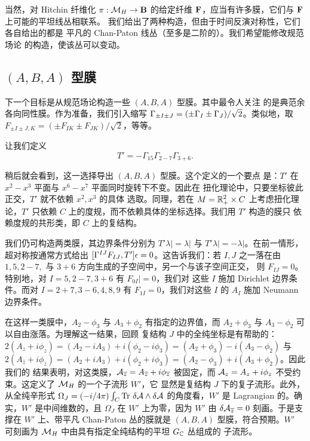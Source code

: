 当然，对 Hitchin 纤维化 $\pi:\MH\to{{\cmmib B}}$ 的给定纤维
${\CMF}$，应当有许多膜，它们与 ${\CMF}$ 上可能的平坦线丛相联系。
我们给出了两种构造，但由于时间反演对称性，它们各自给出的都是
平凡的 Chan-Paton 线丛（至多是二阶的）。我们希望能修改规范场论
的构造，使该丛可以变动。

\subsection{$(A,B,A)$ 型膜}\label{sec:xgoto}

下一个目标是从规范场论构造一些 $(A,B,A)$ 型膜。其中最令人关注
的是典范余各向同性膜。作为准备，我们引入缩写
$\Gamma_{\pm I\pm J}=(\pm \G_I\pm \G_J)/\sqrt 2$。类似地，取
$F_{\pm I\pm J,K}=(\pm F_{IK}\pm F_{JK})/\sqrt 2$，等等。

让我们定义 %
\setcounter{equation}{27}
\begin{equation}\label{eq:jokko}
T'=-\Gamma_{15}\Gamma_{2-7}\Gamma_{3+6}.
\end{equation}

稍后就会看到，这一选择导出 $(A,B,A)$ 型膜。这个定义的一个要点
是：$T'$ 在 $x^2-x^3$ 平面与 $x^6-x^7$ 平面同时旋转下不变。因此在
扭化理论中，只要坐标彼此正交，$T'$ 就不依赖 $x^2,x^3$ 的具体
选取。同理，若在 $M=\RR_+^2\times C$ 上考虑扭化理论，$T'$ 只依赖
$C$ 上的度规，而不依赖具体的坐标选择。我们用 $T'$ 构造的膜只
依赖度规的共形类，即 $C$ 上的复结构。

我们仍可构造两类膜，其边界条件分别为 $T'\lambda|=\lambda|$ 与
$T'\lambda|=-\lambda|$。在前一情形，超对称按通常方式给出
$[\G^{IJ}F_{IJ},T']\epsilon=0$。这告诉我们：若 $I,J$ 之一落在由
$1,5,2-7,$ 与 $3+6$ 方向生成的子空间中，另一个与该子空间正交，
则 $F_{IJ}=0$。特别地，对 $I=5,2-7,3+6$ 有 $F_{0I}|=0$，我们对
这些 $I$ 施加 Dirichlet 边界条件。而对 $I=2+7,3-6,4,8,9$ 有
$F_{1I}=0$，我们对这些 $I$ 的 $A_I$ 施加 Neumann 边界条件。

在这样一类膜中，$A_2-\phi_3$ 与 $A_3+\phi_2$ 有指定的边界值，而
$A_2+\phi_3$ 与 $A_3-\phi_2$ 可以自由涨落。为理解这一结果，回顾
复结构 $J$ 中的全纯坐标是有帮助的：
$2(A_z+i\phi_z)=(A_2-i A_3)+i(\phi_2-i\phi_3)=(A_2+\phi_3)-i(
A_3-\phi_2)$ 与
$2(A_{\bar z}+i\phi_{\bar z})=(A_2+i
A_3)+i(\phi_2+i\phi_3)=(A_2-\phi_3)+i( A_3+\phi_2)$。因此我们的
结果表明，对这类膜，${\cal A}_{\bar
z}=A_{\bar z}+i\phi_{\bar z}$ 被固定，而 ${\cal A}_{ z}=A_{
z}+i\phi_{ z}$ 不受约束。这定义了 $\MH$ 的一个子流形 $W'$，它
显然是复结构 $J$ 下的复子流形。此外，从全纯辛形式
$\Omega_J=(-i/4\pi)\int_C\Tr\, \delta {\cal A}\wedge \delta {\cal
A}$ 的角度看，$W'$ 是 Lagrangian 的。确实，$W'$ 是中间维数的，且
$\Omega_J$ 在 $W'$ 上为零，因为 $W'$ 由
$\delta {\cal A}_{\bar z}=0$ 刻画。于是支撑在 $W'$ 上、带平凡
Chan-Paton 丛的膜就是 $(A,B,A)$ 型膜，符合预期。$W'$ 可刻画为
$\MH$ 中由具有指定全纯结构的平坦 $G_{{\Bbb{C}}}$ 丛组成的
子流形。

